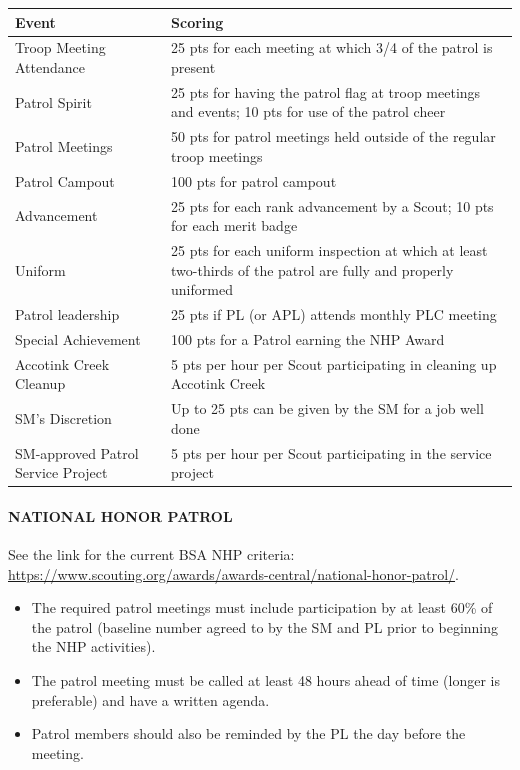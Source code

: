 \documentclass{ltxguide}
\begin{document}
\begin{tabular}{ l l }
	\textbf{Event} & \textbf{Scoring} \\
	\hline
	Troop Meeting Attendance 				& 25 pts for each meeting at which 3/4 of the patrol is present \\
	Patrol Spirit 							& 25 pts for having the patrol flag at troop meetings and events; 10 pts for use of the patrol cheer \\
	Patrol Meetings 						& 50 pts for patrol meetings held outside of the regular troop meetings \\
	Patrol Campout							& 100 pts for patrol campout \\
	Advancement								& 25 pts for each rank advancement by a Scout; 10 pts for each merit badge \\
	Uniform									& 25 pts for each uniform inspection at which at least two-thirds of the patrol are fully and properly uniformed \\	
	Patrol leadership						& 25 pts if \ac{PL} (or \ac{APL}) attends monthly \ac{PLC} meeting \\
	Special Achievement						& 100 pts for a Patrol earning the \ac{NHP} Award \\
	Accotink Creek Cleanup					& 5 pts per hour per Scout participating in cleaning up Accotink Creek \\
	\ac{SM}'s Discretion				& Up to 25 pts can be given by the SM for a job well done \\
	\ac{SM}-approved Patrol Service Project & 5 pts per hour per Scout participating in the service project \\
	\hline
\end{tabular}

\paragraph{NATIONAL HONOR PATROL}
See the link for the current \ac{BSA} \ac{NHP} criteria: \url{https://www.scouting.org/awards/awards-central/national-honor-patrol/}.
\begin{itemize}
	\item The required patrol meetings must include participation by at least 60\% of the patrol (baseline number agreed to by the \ac{SM} and \ac{PL} prior to beginning the NHP activities).
	\item The patrol meeting must be called at least 48 hours ahead of time (longer is preferable) and have a written agenda.
	\item Patrol members should also be reminded by the \ac{PL} the day before the meeting.
\end{itemize}
\end{document}
